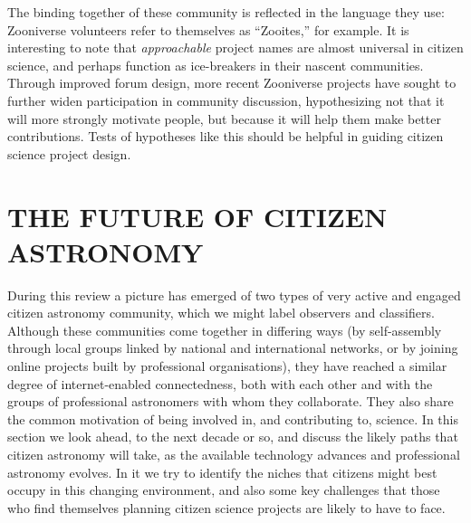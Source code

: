 \documentclass{ar2e}
\begin{document}
The binding together of these community  is reflected in the language they
use: Zooniverse volunteers refer to themselves as ``Zooites,''  for example. 
It is interesting to note that \textit{approachable} project names are almost 
universal in citizen science, and perhaps function as ice-breakers in their
nascent communities. Through improved forum design, more recent Zooniverse
projects have sought to further widen participation in community discussion,
hypothesizing not that it will more strongly motivate people, but because it
will help them make better contributions. Tests of hypotheses like this should
be helpful in guiding citizen science project design.



\section{THE FUTURE OF CITIZEN ASTRONOMY}
\label{sec:future}


During this review a picture has emerged of two types of very active and engaged
citizen astronomy community, which we might label observers and classifiers. 
Although these communities come together in differing ways (by self-assembly
through local groups linked by national and international networks, or by
joining online projects built by professional organisations), they have reached
a similar degree of internet-enabled connectedness, both with each other and
with the groups of professional astronomers with whom they  collaborate. They
also share the common motivation of being involved in, and contributing to,
science. In this section we look ahead, to the next decade or so, and discuss
the likely paths that citizen astronomy will take, as the available technology
advances and professional astronomy evolves. In it we try to identify the niches
that citizens might best occupy in this changing environment, and also some key
challenges that those who find themselves planning citizen science projects are
likely to have to face.


\end{document}
